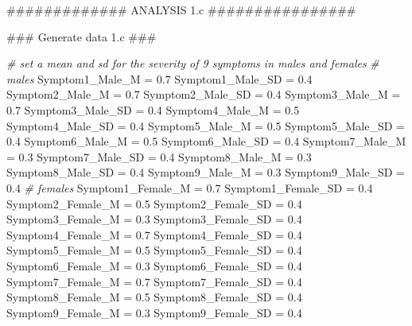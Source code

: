 \documentclass[]{article}
\newenvironment{Shaded}{\begin{snugshade}}{\end{snugshade}}
\newcommand{\FloatTok}[1]{\textcolor[rgb]{0.00,0.00,0.81}{#1}}
\newcommand{\StringTok}[1]{\textcolor[rgb]{0.31,0.60,0.02}{#1}}
\newcommand{\CommentTok}[1]{\textcolor[rgb]{0.56,0.35,0.01}{\textit{#1}}}
\newcommand{\AlertTok}[1]{\textcolor[rgb]{0.94,0.16,0.16}{#1}}
\newcommand{\NormalTok}[1]{#1}
\begin{document}
\begin{Shaded}
\begin{Highlighting}[]
\NormalTok{############# ANALYSIS 1.c ################}

\NormalTok{### Generate data 1.c }\AlertTok{###}

\CommentTok{# set a mean and sd for the severity of 9 symptoms in males and females}
\CommentTok{# males}
\NormalTok{Symptom1_Male_M =}\StringTok{ }\FloatTok{0.7}
\NormalTok{Symptom1_Male_SD =}\StringTok{ }\FloatTok{0.4}
\NormalTok{Symptom2_Male_M =}\StringTok{ }\FloatTok{0.7}
\NormalTok{Symptom2_Male_SD =}\StringTok{ }\FloatTok{0.4}
\NormalTok{Symptom3_Male_M =}\StringTok{ }\FloatTok{0.7}
\NormalTok{Symptom3_Male_SD =}\StringTok{ }\FloatTok{0.4}
\NormalTok{Symptom4_Male_M =}\StringTok{ }\FloatTok{0.5}
\NormalTok{Symptom4_Male_SD =}\StringTok{ }\FloatTok{0.4}
\NormalTok{Symptom5_Male_M =}\StringTok{ }\FloatTok{0.5}
\NormalTok{Symptom5_Male_SD =}\StringTok{ }\FloatTok{0.4}
\NormalTok{Symptom6_Male_M =}\StringTok{ }\FloatTok{0.5}
\NormalTok{Symptom6_Male_SD =}\StringTok{ }\FloatTok{0.4}
\NormalTok{Symptom7_Male_M =}\StringTok{ }\FloatTok{0.3}
\NormalTok{Symptom7_Male_SD =}\StringTok{ }\FloatTok{0.4}
\NormalTok{Symptom8_Male_M =}\StringTok{ }\FloatTok{0.3}
\NormalTok{Symptom8_Male_SD =}\StringTok{ }\FloatTok{0.4}
\NormalTok{Symptom9_Male_M =}\StringTok{ }\FloatTok{0.3}
\NormalTok{Symptom9_Male_SD =}\StringTok{ }\FloatTok{0.4}
\CommentTok{# females}
\NormalTok{Symptom1_Female_M =}\StringTok{ }\FloatTok{0.7}
\NormalTok{Symptom1_Female_SD =}\StringTok{ }\FloatTok{0.4}
\NormalTok{Symptom2_Female_M =}\StringTok{ }\FloatTok{0.5}
\NormalTok{Symptom2_Female_SD =}\StringTok{ }\FloatTok{0.4}
\NormalTok{Symptom3_Female_M =}\StringTok{ }\FloatTok{0.3}
\NormalTok{Symptom3_Female_SD =}\StringTok{ }\FloatTok{0.4}
\NormalTok{Symptom4_Female_M =}\StringTok{ }\FloatTok{0.7}
\NormalTok{Symptom4_Female_SD =}\StringTok{ }\FloatTok{0.4}
\NormalTok{Symptom5_Female_M =}\StringTok{ }\FloatTok{0.5}
\NormalTok{Symptom5_Female_SD =}\StringTok{ }\FloatTok{0.4}
\NormalTok{Symptom6_Female_M =}\StringTok{ }\FloatTok{0.3}
\NormalTok{Symptom6_Female_SD =}\StringTok{ }\FloatTok{0.4}
\NormalTok{Symptom7_Female_M =}\StringTok{ }\FloatTok{0.7}
\NormalTok{Symptom7_Female_SD =}\StringTok{ }\FloatTok{0.4}
\NormalTok{Symptom8_Female_M =}\StringTok{ }\FloatTok{0.5}
\NormalTok{Symptom8_Female_SD =}\StringTok{ }\FloatTok{0.4}
\NormalTok{Symptom9_Female_M =}\StringTok{ }\FloatTok{0.3}
\NormalTok{Symptom9_Female_SD =}\StringTok{ }\FloatTok{0.4}


\end{Highlighting}
\end{Shaded}
\end{document}
